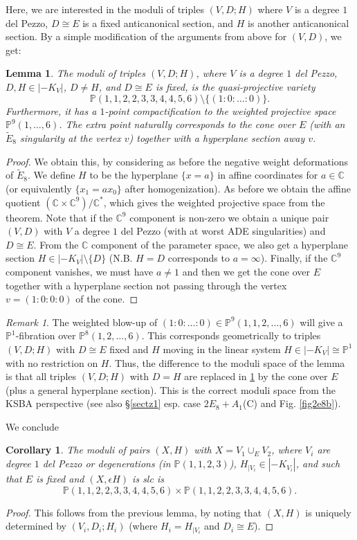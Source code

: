 \documentclass{amsart}
\numberwithin{equation}{section}
\theoremstyle{plain}
\newtheorem{lemma}[equation]{Lemma}
\newtheorem{corollary}[equation]{Corollary}
\theoremstyle{remark}
\newtheorem{remark}[equation]{Remark}
\theoremstyle{definition}
\newcommand{\bP}{\mathbb{P}}
\newcommand{\bC}{\mathbb{C}}
\newcommand{\Ee}{\widetilde{E}_8}
\begin{document}
Here, we are interested in the moduli of triples $(V,D;H)$ where $V$ is a degree $1$ del Pezzo, $D\cong E$ is a fixed anticanonical section, and $H$ is another anticanonical section. By a simple modification of the  arguments from above for $(V,D)$, we get:
\begin{lemma}\label{modulipairs}
The moduli of triples $(V,D;H)$, where $V$ is a degree $1$ del Pezzo, $D,H\in |-K_V|$, $D\neq H$, and $D\cong E$ is fixed, is the quasi-projective variety 
$$\bP(1,1,2,2,3,3,4,4,5,6)\setminus\{(1:0:\dots:0)\}.$$  
Furthermore, it has a $1$-point compactification to the weighted projective space $\bP^9(1,\dots,6)$. The extra point naturally corresponds to the cone over $E$ (with an $\Ee$ singularity at the vertex $v$) together with a hyperplane section away $v$. 
\end{lemma}
\begin{proof}
We obtain this, by considering as before the negative weight deformations  of $\Ee$. We define $H$ to be the hyperplane $\{x=a\}$ in affine coordinates for $a\in \bC$ (or equivalently $\{x_1=ax_0\}$ after homogenization). As before we obtain the affine quotient $(\bC\times \bC^9)/\bC^*$, which gives the weighted projective space from the theorem. Note that if the $\bC^9$ component is non-zero we obtain a unique pair $(V,D)$ with $V$ a degree $1$ del Pezzo (with at worst ADE singularities) and $D\cong E$. From the $\bC$ component of the parameter space, we also get a hyperplane section $H\in |-K_V|\setminus \{D\}$ (N.B. $H=D$ corresponds to $a=\infty$). Finally, if the $\bC^9$ component vanishes, we must have $a\neq 1$ and then we get the cone over $E$ together with a hyperplane section not passing through the vertex $v=(1:0:0:0)$ of the cone. 
\end{proof}

\begin{remark}
The weighted blow-up of $(1:0:\dots:0)\in \bP^9(1,1,2,\dots,6)$ will give a $\bP^1$-fibration over $\bP^8(1,2,\dots,6)$. This corresponds geometrically to triples $(V,D;H)$ with $D\cong E$ fixed and $H$ moving in the linear system $H\in|-K_V|\cong \bP^1$ with no restriction on $H$.  Thus, the difference to the moduli space of the lemma is that all triples $(V,D;H)$ with $D=H$ are replaced in \ref{modulipairs} by the cone over $E$ (plus a general hyperplane section). This is the correct moduli space from the KSBA perspective (see also  \S\ref{sectz1} esp.  case $2E_8+A_1$(C) and Fig. \ref{fig2e8b}). 
\end{remark}
We conclude
\begin{corollary}\label{cor2dp1}
The moduli of pairs $(X,H)$ with $X=V_1\cup_EV_2$, where $V_i$ are degree $1$ del Pezzo or degenerations (in $\bP(1,1,2,3)$), $H_{\mid V_i}\in|-K_{V_i}|$, and such that $E$ is fixed and $(X,\epsilon H)$ is slc is   
$$\bP(1,1,2,2,3,3,4,4,5,6)\times \bP(1,1,2,2,3,3,4,4,5,6).$$
\end{corollary}
\begin{proof}
This follows from the previous lemma, by noting that $(X,H)$ is uniquely determined by $(V_i,D_i;H_i)$ (where $H_i=H_{\mid V_i}$ and $D_i\cong E$). 
\end{proof}
\end{document}
